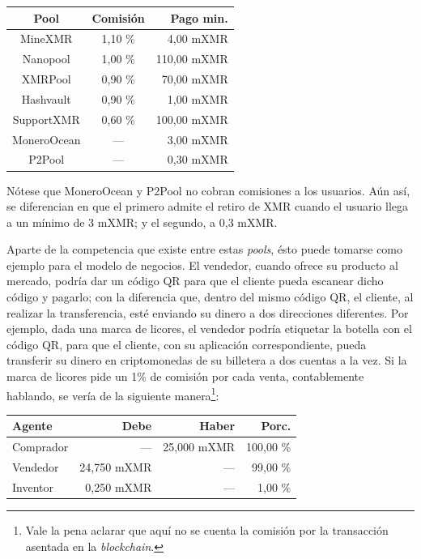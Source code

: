 \documentclass[12pt,a4paper]{article}
\begin{document}
\begin{center}
\begin{tabular}{|c|c|r|}
\hline 
\textbf{Pool} & \textbf{Comisión} & \textbf{Pago min.} \\ 
\hline 
MineXMR & 1,10 \% & 4,00 mXMR \\ 
\hline 
Nanopool & 1,00 \% & 110,00 mXMR \\ 
\hline 
XMRPool & 0,90 \% & 70,00 mXMR \\ 
\hline 
Hashvault & 0,90 \% & 1,00 mXMR \\ 
\hline 
SupportXMR & 0,60 \% & 100,00 mXMR \\ 
\hline 
MoneroOcean & — & 3,00 mXMR \\ 
\hline 
P2Pool & — & 0,30 mXMR \\ 
\hline 
\end{tabular} 
\end{center}

Nótese que MoneroOcean y P2Pool no cobran comisiones a los usuarios. Aún así, se diferencian en que el primero admite el retiro de XMR cuando el usuario llega a un mínimo de 3 mXMR; y el segundo, a 0,3 mXMR.

Aparte de la competencia que existe entre estas \textit{pools}, ésto puede tomarse como ejemplo para el modelo de negocios. El vendedor, cuando ofrece su producto al mercado, podría dar un código QR para que el cliente pueda escanear dicho código y pagarlo; con la diferencia que, dentro del mismo código QR, el cliente, al realizar la transferencia, esté enviando su dinero a dos direcciones diferentes. Por ejemplo, dada una marca de licores, el vendedor podría etiquetar la botella con el código QR, para que el cliente, con su aplicación correspondiente, pueda transferir su dinero en criptomonedas de su billetera a dos cuentas a la vez. Si la marca de licores pide un 1\% de comisión por cada venta, contablemente hablando, se vería de la siguiente manera\footnote{Vale la pena aclarar que aquí no se cuenta la comisión por la transacción asentada en la \textit{blockchain}.}:

\begin{center}
\begin{tabular}{|l|r|r|r|}
\hline 
\textbf{Agente} & \textbf{Debe} & \textbf{Haber} & \textbf{Porc.} \\ 
\hline 
Comprador & — & 25,000 mXMR & 100,00 \% \\ 
\hline 
Vendedor & 24,750 mXMR & — & 99,00 \% \\
\hline 
Inventor & 0,250 mXMR & — & 1,00 \% \\ 
\hline 
\end{tabular} 
\end{center}
\end{document}
